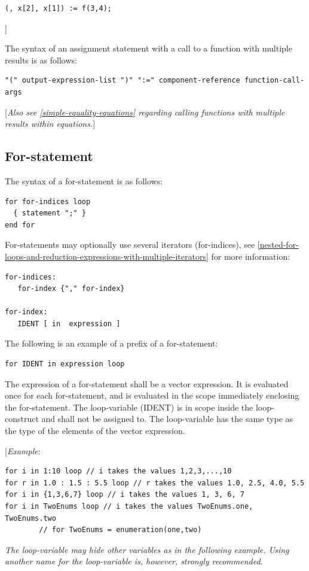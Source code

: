 \documentclass[10pt,a4paper]{report}
\def\doublelabel#1{\label{#1}}
\begin{document}
\begin{lstlisting}[language=modelica]
  (, x[2], x[1]) := f(3,4);
\end{lstlisting}
{]}

The syntax of an assignment statement with a call to a function with
multiple results is as follows:
\begin{lstlisting}[language=grammar]
"(" output-expression-list ")" ":=" component-reference function-call-args
\end{lstlisting}

{[}\emph{Also see \ref{simple-equality-equations} regarding calling functions with
multiple results within equations.}{]}

\subsection{For-statement}\doublelabel{for-statement}

The syntax of a for-statement is as follows:

\begin{lstlisting}[language=grammar]
for for-indices loop
  { statement ";" }
end for
\end{lstlisting}
For-statements may optionally use several iterators (for-indices), see
\ref{nested-for-loops-and-reduction-expressions-with-multiple-iterators} for more information:

\begin{lstlisting}[language=grammar]
for-indices:
   for-index {"," for-index}

for-index:
   IDENT [ in  expression ]
\end{lstlisting}
The following is an example of a prefix of a for-statement:

\begin{lstlisting}[language=modelica]
for IDENT in expression loop
\end{lstlisting}
The expression of a for-statement shall be a vector expression. It is
evaluated once for each for-statement, and is evaluated in the scope
immediately enclosing the for-statement. The loop-variable (IDENT) is in
scope inside the loop-construct and shall not be assigned to. The
loop-variable has the same type as the type of the elements of the
vector expression.

{[}\emph{Example}:

\begin{lstlisting}[language=modelica]
for i in 1:10 loop // i takes the values 1,2,3,...,10
for r in 1.0 : 1.5 : 5.5 loop // r takes the values 1.0, 2.5, 4.0, 5.5
for i in {1,3,6,7} loop // i takes the values 1, 3, 6, 7
for i in TwoEnums loop // i takes the values TwoEnums.one, TwoEnums.two
        // for TwoEnums = enumeration(one,two)
\end{lstlisting}
\emph{The loop-variable may hide other variables as in the following
example. Using another name for the loop-variable is, however, strongly
recommended.}
\end{document}
